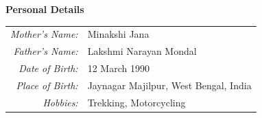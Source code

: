 \documentclass[12pt]{article}
\begin{document}
\newpage
\vspace{0.6cm}
\colorbox{gray!40}{\begin{minipage}{17.5cm}
\bf {Personal Details}
\end{minipage} }

\begin{minipage}{1.05\textwidth}
\vspace{0.4cm}
\begin{tabular}{ r l}
  {\emph {Mother's Name:}} & Minakshi Jana \\[0.2cm]
  {\emph {Father's Name:}} & Lakshmi Narayan Mondal \\[0.2cm]
  {\emph {Date of Birth:}} & 12 March 1990 \\[0.2cm]
  {\emph {Place of Birth:}} & Jaynagar Majilpur, West Bengal, India \\[0.2cm]
  {\emph {Hobbies:}} & Trekking, Motorcycling \\[0.2cm]
\end{tabular}
\end{minipage} 
\end{document}
